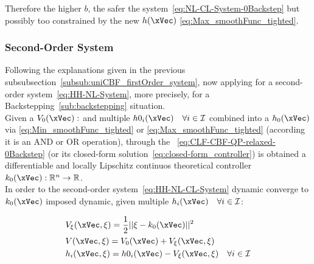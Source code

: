 \begin{description}
    Therefore the higher \(b\), the safer the system~\ref{eq:NL-CL-System-0Backstep} but possibly too constrained by the new  \(h(\xVec)\) \ref{eq:Max_smoothFunc_tighted}. 
\end{description}



\subsubsection{Second-Order System}
\label{subsub:uniCBF_secondOrder_system}

Following the explanations given in the previous subsubsection~\ref{subsub:uniCBF_firstOrder_system}, now applying for a second-order system~\ref{eq:HH-NL-System}, more precisely, for a Backstepping~\ref{sub:backstepping} situation. \\

Given a  \(V_0(\xVec): \) and multiple  \(h0_i(\xVec) \quad \forall i \in \mathcal{I}\) combined into a  \(h_0(\xVec)\) via \ref{eq:Min_smoothFunc_tighted} or \ref{eq:Max_smoothFunc_tighted} (according it is an AND or OR operation), through the ~\ref{eq:CLF-CBF-QP-relaxed-0Backstep} (or its closed-form solution~\ref{eq:closed-form_controller}) is obtained a differentiable and locally Lipschitz continuos theoretical controller \(k_0(\xVec): \mathbb{R}^n \to \mathbb{R}\). \\

In order to the second-order system~\ref{eq:HH-NL-CL-System} dynamic converge to \(k_0(\xVec)\) imposed dynamic, given multiple  \(h_i(\xVec) \quad \forall i \in \mathcal{I} \):

\begin{subequations}
    \label{eq:Backstepp_CF_multipleCBF}
    \begin{align}
        &V_{\mathbf{\xi}}(\xVec, \mathbf{\xi}) = \frac{1}{2}|| \mathbf{\xi} -  k_0(\xVec) ||^2 
        \label{eq:Backstepp_prejudice_multipleCBF}\\
        &V(\xVec, \mathbf{\xi}) = V_0(\xVec) + V_{\mathbf{\xi}}(\xVec, \mathbf{\xi}) 
        \label{eq:Backstepp_V_multipleCBF}\\
        &h_i(\xVec, \mathbf{\xi}) = h0_i(\xVec) - V_{\mathbf{\xi}}(\xVec, \mathbf{\xi}) \quad \forall i \in \mathcal{I}
        \label{eq:Backstepp_h_multipleCBF}
    \end{align}
\end{subequations}

